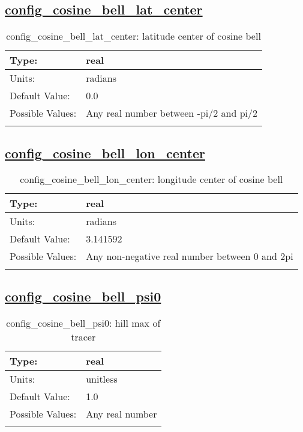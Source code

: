 \subsection[config\_cosine\_bell\_lat\_center]{\hyperref[sec:nm_tab_cosine_bell]{config\_cosine\_bell\_lat\_center}}
\label{subsec:nm_sec_config_cosine_bell_lat_center}
\begin{center}
\begin{longtable}{| p{2.0in} || p{4.0in} |}
    \hline
    Type: & real \\
    \hline
    Units: & \si{radians} \\
    \hline
    Default Value: & 0.0 \\
    \hline
    Possible Values: & Any real number between -pi/2 and pi/2 \\
    \hline
    \caption{config\_cosine\_bell\_lat\_center: latitude center of cosine bell}
\end{longtable}
\end{center}
\subsection[config\_cosine\_bell\_lon\_center]{\hyperref[sec:nm_tab_cosine_bell]{config\_cosine\_bell\_lon\_center}}
\label{subsec:nm_sec_config_cosine_bell_lon_center}
\begin{center}
\begin{longtable}{| p{2.0in} || p{4.0in} |}
    \hline
    Type: & real \\
    \hline
    Units: & \si{radians} \\
    \hline
    Default Value: & 3.141592 \\
    \hline
    Possible Values: & Any non-negative real number between 0 and 2pi \\
    \hline
    \caption{config\_cosine\_bell\_lon\_center: longitude center of cosine bell}
\end{longtable}
\end{center}
\subsection[config\_cosine\_bell\_psi0]{\hyperref[sec:nm_tab_cosine_bell]{config\_cosine\_bell\_psi0}}
\label{subsec:nm_sec_config_cosine_bell_psi0}
\begin{center}
\begin{longtable}{| p{2.0in} || p{4.0in} |}
    \hline
    Type: & real \\
    \hline
    Units: & \si{unitless} \\
    \hline
    Default Value: & 1.0 \\
    \hline
    Possible Values: & Any real number \\
    \hline
    \caption{config\_cosine\_bell\_psi0: hill max of tracer}
\end{longtable}
\end{center}
